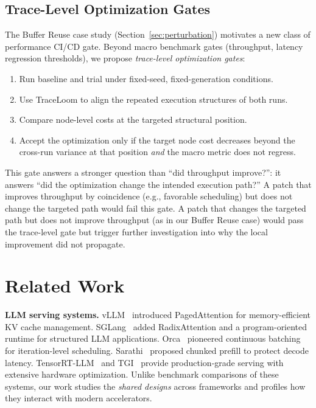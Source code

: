 \documentclass[conference]{IEEEtran}
\begin{document}
\subsection{Trace-Level Optimization Gates}

The Buffer Reuse case study (Section~\ref{sec:perturbation}) motivates a new
class of performance CI/CD gate. Beyond macro benchmark gates (throughput,
latency regression thresholds), we propose \emph{trace-level optimization
gates}:

\begin{enumerate}
\item Run baseline and trial under fixed-seed, fixed-generation conditions.
\item Use TraceLoom to align the repeated execution structures of both runs.
\item Compare node-level costs at the targeted structural position.
\item Accept the optimization only if the target node cost decreases beyond
the cross-run variance at that position \emph{and} the macro metric does not
regress.
\end{enumerate}

This gate answers a stronger question than ``did throughput improve?'': it
answers ``did the optimization change the intended execution path?'' A patch
that improves throughput by coincidence (e.g., favorable scheduling) but does
not change the targeted path would fail this gate. A patch that changes the
targeted path but does not improve throughput (as in our Buffer Reuse case)
would pass the trace-level gate but trigger further investigation into why
the local improvement did not propagate.


\section{Related Work}

\textbf{LLM serving systems.} vLLM~\cite{vllm} introduced PagedAttention for
memory-efficient KV cache management. SGLang~\cite{sglang} added
RadixAttention and a program-oriented runtime for structured LLM applications.
Orca~\cite{orca} pioneered continuous batching for iteration-level scheduling.
Sarathi~\cite{sarathi} proposed chunked prefill to protect decode latency.
TensorRT-LLM~\cite{tensorrtllm} and TGI~\cite{tgi} provide production-grade
serving with extensive hardware optimization. Unlike benchmark comparisons of
these systems, our work studies the \emph{shared designs} across frameworks
and profiles how they interact with modern accelerators.
\end{document}
